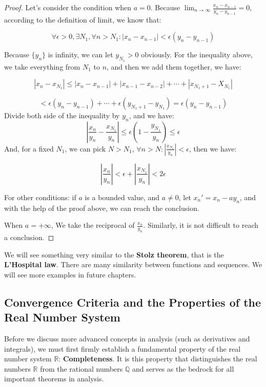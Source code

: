 \documentclass[oneside]{book}
\begin{document}
\begin{proof}
Let's consider the condition when $a=0$.
Because $\lim_{n \to \infty} \frac{x_n -x_{n-1}}{y_n-y_{n-1}}=0$, according to the definition of limit, we know that:

\[
\forall\epsilon > 0, \exists N_1,\forall n> N_1:|x_n-x_{n-1}|<\epsilon(y_n-y_{n-1})
\]

Because $\{y_n\}$ is infinity, we can let $y_{N_1} > 0$ obviously. For the inequality above, we take everything from $N_1$ to $n$, and then we add them together, we have:

\[
|x_n-x_{N_1}|\leq |x_n-x_{n-1}| +|x_{n-1}-x_{n-2}|+\cdots+ |x_{N_1+1}-X_{N_1}|
\]

\[
 < \epsilon (y_n-y_{n-1}) + \cdots + \epsilon (y_{N_1+1}-y_{N_1}) = \epsilon (y_n-y_{n-1})
\]
Divide both side of the inequality by $y_n$, and we have:
\[
|\frac{x_n}{y_n}-\frac{x_{N_1}}{y_n}|\leq \epsilon (1-\frac{y_{N_1}}{y_n}) \leq \epsilon
\]
And, for a fixed $N_1$, we can pick $N>N_1$, $\forall n >N: |\frac{x_{N_1}}{y_n}|<\epsilon$, then we have:

\[
|\frac{x_n}{y_n}|<\epsilon+|\frac{x_{N_1}}{y_n}|<2\epsilon
\]

For other conditions: if $a$ is a bounded value, and $a \neq 0$, let ${x_n}'=x_n-ay_n$, and with the help of the proof above, we can reach the conclusion.

When $a=+\infty$, We take the reciprocal of $\frac{x_n}{y_n}$. Similarly, it is not difficult to reach a conclusion.

\end{proof}

We will see something very similar to the \textbf{Stolz theorem}, that is the \textbf{L'Hospital law}. There are many similarity between functions and sequences. We will see more examples in future chapters.


\subsection{Convergence Criteria and the Properties of the Real Number System}

Before we discuss more advanced concepts in analysis (such as derivatives and integrals), we must first firmly establish a fundamental property of the real number system $\mathbb{R}$: \textbf{Completeness}. It is this property that distinguishes the real numbers $\mathbb{R}$ from the rational numbers $\mathbb{Q}$ and serves as the bedrock for all important theorems in analysis.
\end{document}
